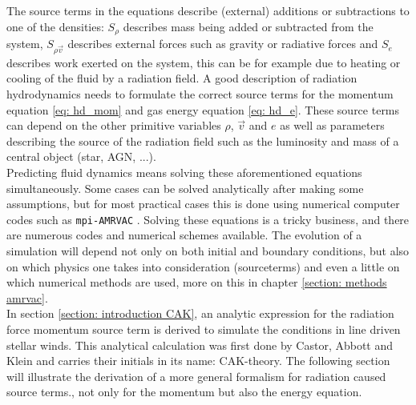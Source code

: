 The source terms in the equations describe (external) additions or subtractions to one of the densities: $S_\rho$ describes mass being added or subtracted from the system, $S_{\rho \vec{v}}$ describes external forces such as gravity or radiative forces and $S_e$ describes work exerted on the system, this can be for example due to heating or cooling of the fluid by a radiation field. A good description of radiation hydrodynamics needs to formulate the correct source terms for the momentum equation \eqref{eq: hd_mom} and gas energy equation \eqref{eq: hd_e}. These source terms can depend on the other primitive variables $\rho$, $\vec{v}$ and $e$ as well as parameters describing the source of the radiation field such as the luminosity and mass of a central object (star, AGN, ...).\\

Predicting fluid dynamics means solving these aforementioned equations simultaneously. Some cases can be solved analytically after making some assumptions, but for most practical cases this is done using numerical computer codes such as \texttt{mpi-AMRVAC} \citep{Porth2014}. Solving these equations is a tricky business, and there are numerous codes and numerical schemes available. The evolution of a simulation will depend not only on both initial and boundary conditions, but also on which physics one takes into consideration (sourceterms) and even a little on which numerical methods are used, more on this in chapter \ref{section: methods amrvac}. \\

In section \ref{section: introduction CAK}, an analytic expression for the radiation force momentum source term is derived to simulate the conditions in line driven stellar winds. This analytical calculation was first done by Castor, Abbott and Klein \citep{CAK1975} and carries their initials in its name: CAK-theory. The following section will illustrate the derivation of a more general formalism for radiation caused source terms., not only for the momentum but also the energy equation. 

